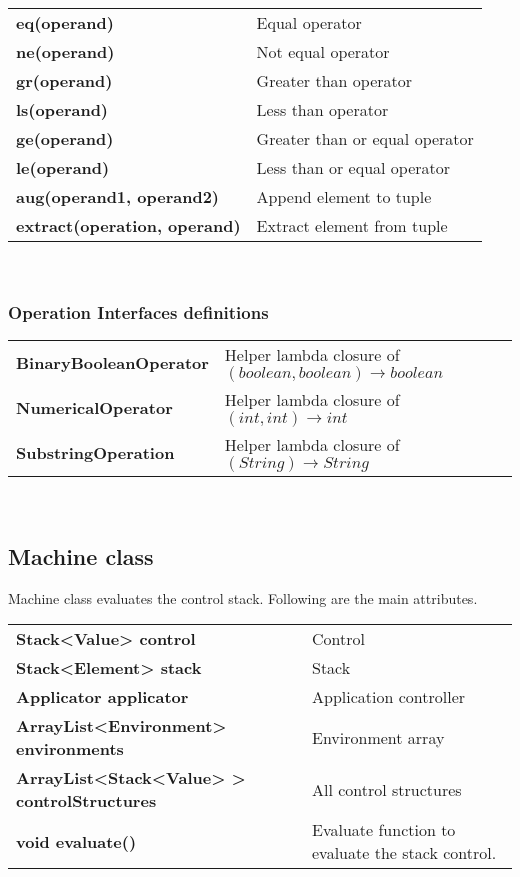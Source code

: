\documentclass[12pt,a4paper]{article}
\begin{document}
\begin{tabular}{lp{6cm}}
        \textbf{eq(operand)} & Equal operator \\
        \textbf{ne(operand)} & Not equal operator \\
        \textbf{gr(operand)} & Greater than operator \\
        \textbf{ls(operand)} & Less than operator \\
        \textbf{ge(operand)} & Greater than or equal operator \\
        \textbf{le(operand)} & Less than or equal operator \\
        \textbf{aug(operand1, operand2)} & Append element to tuple \\
        \textbf{extract(operation, operand)} & Extract element from tuple \\
    \end{tabular} \\

\subsubsection{Operation Interfaces definitions}

    \begin{tabular}{ll}
        \textbf{BinaryBooleanOperator} & Helper lambda closure of $(boolean, boolean) \rightarrow boolean$ \\
        \textbf{NumericalOperator} & Helper lambda closure of $(int, int) \rightarrow int$ \\
        \textbf{SubstringOperation} & Helper lambda closure of $(String) \rightarrow String$ \\
    \end{tabular} \\

\subsection{Machine class}

Machine class evaluates the control stack. Following are the main attributes.

\begin{tabular}{ll}
        \textbf{Stack<Value> control} & Control \\
        \textbf{Stack<Element> stack} & Stack \\
        \textbf{Applicator applicator} & Application controller \\
        \textbf{ArrayList<Environment> environments}&Environment array \\
        \textbf{ArrayList<Stack<Value> > controlStructures} & All control structures \\
        \textbf{void evaluate()} & Evaluate function to evaluate the stack control. \\
\end{tabular} \\
\end{document}
